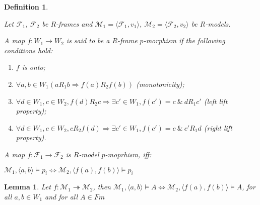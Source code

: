 \documentclass[a4paper]{article}
\theoremstyle{defin}
\newtheorem{defin}{Definition}
\theoremstyle{theorem}
\theoremstyle{prop}
\theoremstyle{lemma}
\newtheorem{lemma}{Lemma}
\theoremstyle{ex}
\theoremstyle{col}
\begin{document}
\begin{defin}
  $ $

  Let $\mathcal{F}_1$, $\mathcal{F}_2$ be $R$-frames and $\mathcal{M}_1 = \langle \mathcal{F}_1, v_1 \rangle$, $\mathcal{M}_2 = \langle \mathcal{F}_2, v_2 \rangle$
  be $R$-models.

  A map $f : W_1 \to W_2$ is said to be a $R$-frame $p$-morphism if the following conditions hold:

  \begin{enumerate}
    \item $f$ is onto;
    \item $\forall a, b \in W_1 (a R_1 b \Rightarrow f(a) R_2 f (b))$ (monotonicity);
    \item $\forall d \in W_1, c \in W_2, f(d) R_2 c \Rightarrow \exists c' \in W_1, f(c') = c \: \& \: d R_1 c'$ (left lift property);
    \item $\forall d \in W_1, c \in W_2, c R_2 f(d) \Rightarrow \exists c' \in W_1, f(c') = c \: \& \: c' R_1 d$ (right lift property).
  \end{enumerate}

  A map $f : \mathcal{F}_1 \to \mathcal{F}_2$ is $R$-model $p$-moprhism, iff:

\begin{center}
 $\mathcal{M}_1, \langle a, b \rangle \models p_i \Leftrightarrow \mathcal{M}_2, \langle f(a), f(b) \rangle \models p_i$
\end{center}

\end{defin}

\begin{lemma}
  Let $f : \mathcal{M}_1 \twoheadrightarrow \mathcal{M}_2$, then
  $\mathcal{M}_1, \langle a, b \rangle \models A \Leftrightarrow \mathcal{M}_2, \langle f(a), f(b) \rangle \models A$,
  for all $a, b \in W_1$ and for all $A \in Fm$
\end{lemma}
\end{document}
